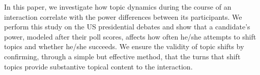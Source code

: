 In this paper, we investigate how topic dynamics during the course of an interaction correlate with the power differences between its participants. We perform this study on the US presidential debates and show that a candidate's power, modeled after their poll scores, affects how often he/she attempts to shift topics and whether he/she succeeds. We ensure the validity of topic shifts by confirming, through a simple but effective method, that the turns that shift topics provide substantive topical content to the interaction.
